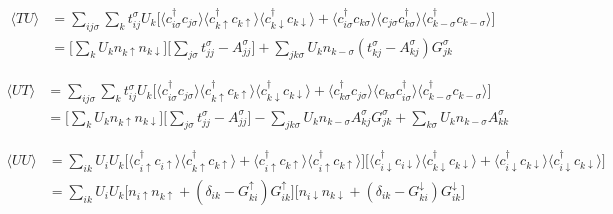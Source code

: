 \documentclass{revtex4}
\begin{document}
\begin{equation}
\begin{split}
\langle TU \rangle 
&=\sum_{ij\sigma}\sum_k t_{ij}^\sigma U_k 
\Big[\langle c_{i\sigma}^\dagger c_{j\sigma}\rangle 
\langle c^\dagger_{k\uparrow} c_{k\uparrow}\rangle
\langle c^\dagger_{k\downarrow} c_{k\downarrow} \rangle
+
\langle c_{i\sigma}^\dagger c_{k\sigma}\rangle 
\langle c_{j\sigma} c^\dagger_{k\sigma}\rangle
\langle c^\dagger_{k -\sigma} c_{k -\sigma} \rangle\Big] \\
&=\Big[\sum_k U_k n_{k\uparrow} n_{k\downarrow}\Big]
\Big[\sum_{j\sigma} t_{jj}^\sigma - A_{jj}^\sigma\Big]
+
\sum_{jk\sigma} U_k n_{k-\sigma} (t_{kj}^\sigma- A_{kj}^\sigma) G_{jk}^\sigma
\end{split}
\end{equation}

\begin{equation}
\begin{split}
\langle UT \rangle 
&=\sum_{ij\sigma}\sum_k t_{ij}^\sigma U_k 
\Big[\langle c_{i\sigma}^\dagger c_{j\sigma}\rangle 
\langle c^\dagger_{k\uparrow} c_{k\uparrow}\rangle
\langle c^\dagger_{k\downarrow} c_{k\downarrow} \rangle
+
\langle c_{k\sigma}^\dagger c_{j\sigma}\rangle 
\langle c_{k\sigma} c^\dagger_{i\sigma}\rangle
\langle c^\dagger_{k -\sigma} c_{k -\sigma} \rangle\Big] \\
&=\Big[\sum_k U_k n_{k\uparrow} n_{k\downarrow}\Big]
\Big[\sum_{j\sigma} t_{jj}^\sigma - A_{jj}^\sigma\Big]
-
\sum_{jk\sigma} U_k n_{k-\sigma} A_{kj}^\sigma G_{jk}^\sigma
+\sum_{k\sigma} U_k n_{k-\sigma} A_{kk}^\sigma
\end{split}
\end{equation}

\begin{equation}
\begin{split}
\langle UU \rangle 
&=\sum_{ik} U_i U_k
\Big[
\langle c_{i\uparrow}^\dagger c_{i\uparrow}\rangle 
\langle c_{k\uparrow}^\dagger c_{k\uparrow}\rangle +
\langle c_{i\uparrow}^\dagger c_{k\uparrow}\rangle 
\langle c_{i\uparrow}^\dagger c_{k\uparrow}\rangle 
\Big]
\Big[
\langle c_{i\downarrow}^\dagger c_{i\downarrow}\rangle 
\langle c_{k\downarrow}^\dagger c_{k\downarrow}\rangle +
\langle c_{i\downarrow}^\dagger c_{k\downarrow}\rangle 
\langle c_{i\downarrow}^\dagger c_{k\downarrow}\rangle 
\Big] \\
&=\sum_{ik} U_i U_k
\Big[
n_{i\uparrow} n_{k\uparrow} +
(\delta_{ik}-G_{ki}^\uparrow)G_{ik}^\uparrow
\Big]
\Big[
n_{i\downarrow} n_{k\downarrow} +
(\delta_{ik}-G_{ki}^\downarrow)G_{ik}^\downarrow
\Big]
\end{split}
\end{equation}
\end{document}
